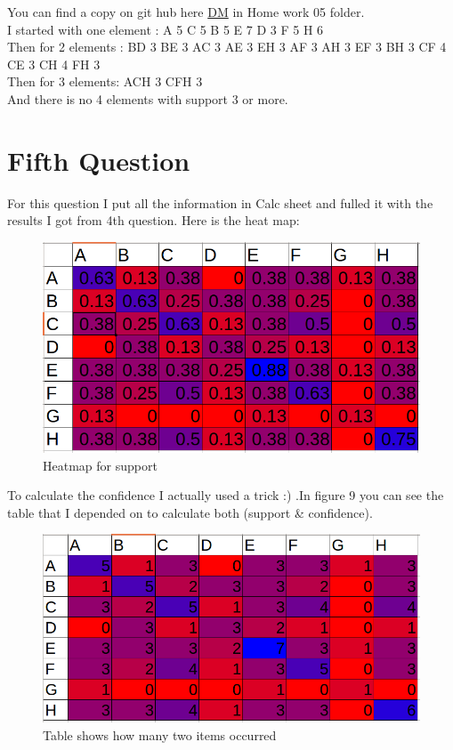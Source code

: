 \documentclass{article}
\begin{document}
You can find a copy on git hub here \href{https://github.com/aqeel13932/DM}{DM} in Home work 05 folder.\\
I started with one element :
A 5
C 5
B 5
E 7
D 3
F 5
H 6\\
Then for 2 elements :
BD 3
BE 3
AC 3
AE 3
EH 3
AF 3
AH 3
EF 3
BH 3
CF 4
CE 3
CH 4
FH 3\\
Then for 3 elements:
ACH 3
CFH 3\\
And there is no 4 elements with support 3 or more.
	\section*{Fifth Question}
For this question I put all the information in Calc sheet and fulled it with the results I got from 4th question. Here is the heat map:
\begin{figure}[H]
\includegraphics[scale=0.6]{5q.png}
\caption{Heatmap for support}
\end{figure}
To calculate the confidence I actually used a trick :) .In figure 9 you can see the table that I depended on to calculate both (support \& confidence).
\begin{figure}[H]
\includegraphics[scale=0.6]{5q3.png}
\caption{Table shows how many two items occurred}
\end{figure}
\end{document}
